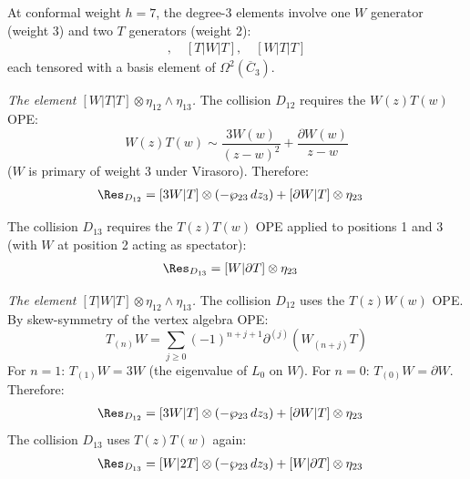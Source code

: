 \begin{computation}
\label{comp:w3-deg3-mixed}

At conformal weight $h = 7$, the degree-3 elements involve
one $W$ generator (weight 3) and two $T$ generators (weight 2):
\begin{align*}
[T|T|W],\quad [T|W|T],\quad [W|T|T]
\end{align*}
each tensored with a basis element of $\Omega^2(\overline{C}_3)$.

\emph{The element $[W|T|T] \otimes \eta_{12} \wedge \eta_{13}$.}
The collision $D_{12}$ requires the $W(z)T(w)$ OPE:
\[
W(z)T(w) \sim \frac{3W(w)}{(z-w)^2} + \frac{\partial W(w)}{z-w}
\]
($W$ is primary of weight 3 under Virasoro).  Therefore:
\begin{align*}
\Res_{D_{12}} &= [3W|T] \otimes (-\wp_{23}\,dz_3)
+ [\partial W|T] \otimes \eta_{23}
\end{align*}

The collision $D_{13}$ requires the $T(z)T(w)$ OPE applied to
positions 1 and 3 (with $W$ at position 2 acting as spectator):
\begin{align*}
\Res_{D_{13}} &= [W|\partial T] \otimes \eta_{23}
\end{align*}

\emph{The element $[T|W|T] \otimes \eta_{12} \wedge \eta_{13}$.}
The collision $D_{12}$ uses the $T(z)W(w)$ OPE.  By
skew-symmetry of the vertex algebra OPE:
\[
T_{(n)}W = \sum_{j \geq 0} (-1)^{n+j+1}\partial^{(j)}(W_{(n+j)}T)
\]
For $n = 1$: $T_{(1)}W = 3W$ (the eigenvalue of $L_0$ on $W$).
For $n = 0$: $T_{(0)}W = \partial W$.  Therefore:
\begin{align*}
\Res_{D_{12}} &= [3W|T] \otimes (-\wp_{23}\,dz_3)
+ [\partial W|T] \otimes \eta_{23}
\end{align*}
The collision $D_{13}$ uses $T(z)T(w)$ again:
\begin{align*}
\Res_{D_{13}} &= [W|2T] \otimes (-\wp_{23}\,dz_3)
+ [W|\partial T] \otimes \eta_{23}
\end{align*}
\end{computation}

